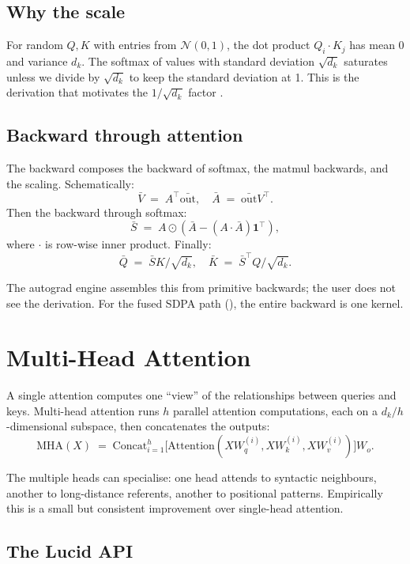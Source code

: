 \subsection{Why the scale}
\label{ssec:attention:why_scale}

For random $Q, K$ with entries from $\mathcal{N}(0, 1)$, the dot
product $Q_i \cdot K_j$ has mean 0 and variance $d_k$. The
softmax of values with standard deviation $\sqrt{d_k}$ saturates
unless we divide by $\sqrt{d_k}$ to keep the standard deviation
at 1. This is the derivation that motivates the $1/\sqrt{d_k}$
factor \cite{vaswani_attention_2017}.

\subsection{Backward through attention}
\label{ssec:attention:backward}

The backward composes the backward of softmax, the matmul
backwards, and the scaling. Schematically:
\[
\bar V \;=\; A^\top \bar{\mathrm{out}}, \quad
\bar A \;=\; \bar{\mathrm{out}} V^\top.
\]
Then the backward through softmax:
\[
\bar S \;=\; A \odot (\bar A - (A \cdot \bar A) \mathbf{1}^\top),
\]
where $\cdot$ is row-wise inner product. Finally:
\[
\bar Q \;=\; \bar S K / \sqrt{d_k}, \quad
\bar K \;=\; \bar S^\top Q / \sqrt{d_k}.
\]

The autograd engine assembles this from primitive backwards;
the user does not see the derivation. For the fused SDPA path
(), the entire backward is one
kernel.

\section{Multi-Head Attention}
\label{sec:attention:multi_head}

A single attention computes one ``view'' of the relationships
between queries and keys. Multi-head attention runs $h$
parallel attention computations, each on a $d_k / h$-dimensional
subspace, then concatenates the outputs:
\[
\mathrm{MHA}(X) \;=\; \mathrm{Concat}_{i=1}^{h}\bigl[\mathrm{Attention}(X W_q^{(i)}, X W_k^{(i)}, X W_v^{(i)})\bigr] W_o.
\]

The multiple heads can specialise: one head attends to syntactic
neighbours, another to long-distance referents, another to
positional patterns. Empirically this is a small but consistent
improvement over single-head attention.

\subsection{The Lucid API}
\label{ssec:attention:mha_api}

